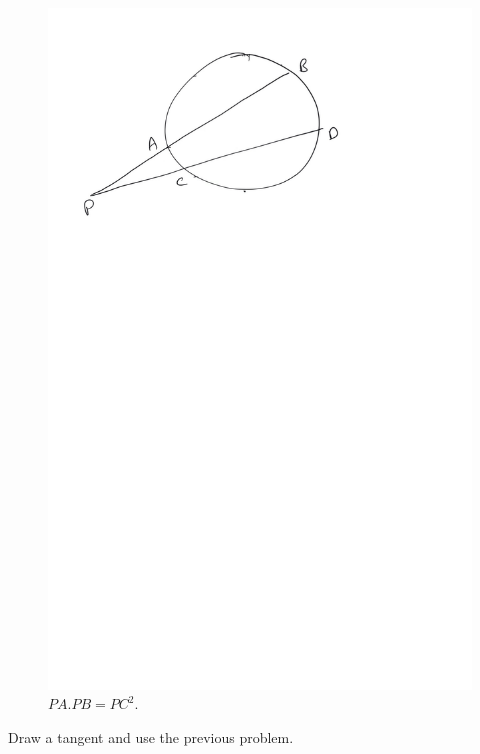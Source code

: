 \begin{figure}[!h]
	\begin{center}
		
		\includegraphics[width=\columnwidth]{./figs/ch4_chord_tangent_prod}
		\vspace*{-10cm}
	\end{center}
	\caption{$PA.PB = PC^2$.}
	\label{ch4_chord_tangent_prod}	
\end{figure}

\proof Draw a tangent and use the previous problem.
